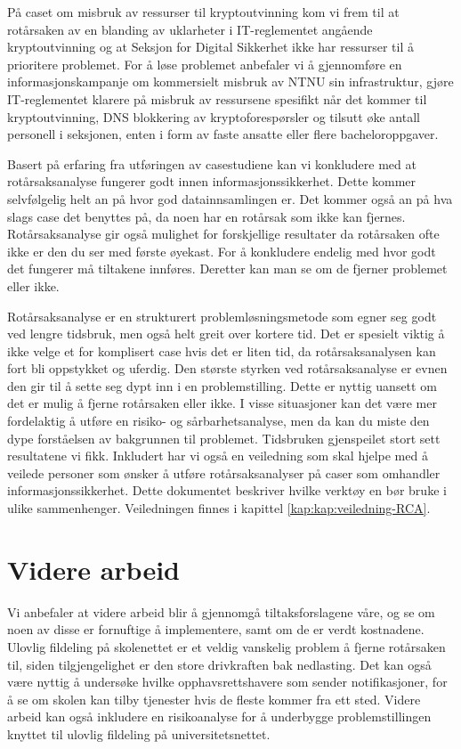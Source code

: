 \noindent På caset om misbruk av ressurser til kryptoutvinning kom vi frem til at rotårsaken av en blanding av uklarheter i IT-reglementet angående kryptoutvinning og at Seksjon for Digital Sikkerhet ikke har ressurser til å prioritere problemet. For å løse problemet anbefaler vi å gjennomføre en informasjonskampanje om kommersielt misbruk av NTNU sin infrastruktur, gjøre IT-reglementet klarere på misbruk av ressursene spesifikt når det kommer til kryptoutvinning, DNS blokkering av kryptoforespørsler og tilsutt øke antall personell i seksjonen, enten i form av faste ansatte eller flere bacheloroppgaver. 
\newline

\noindent Basert på erfaring fra utføringen av casestudiene kan vi konkludere med at rotårsaksanalyse fungerer godt innen informasjonssikkerhet. Dette kommer selvfølgelig helt an på hvor god datainnsamlingen er. Det kommer også an på hva slags case det benyttes på, da noen har en rotårsak som ikke kan fjernes. Rotårsaksanalyse gir også mulighet for forskjellige resultater da rotårsaken ofte ikke er den du ser med første øyekast. For å konkludere endelig med hvor godt det fungerer må tiltakene innføres. Deretter kan man se om de fjerner problemet eller ikke. 
\newline

\noindent Rotårsaksanalyse er en strukturert problemløsningsmetode som egner seg godt ved lengre tidsbruk, men også helt greit over kortere tid. Det er spesielt viktig å ikke velge et for komplisert case hvis det er liten tid, da rotårsaksanalysen kan fort bli oppstykket og uferdig. Den største styrken ved rotårsaksanalyse er evnen den gir til å sette seg dypt inn i en problemstilling. Dette er nyttig uansett om det er mulig å fjerne rotårsaken eller ikke. I visse situasjoner kan det være mer fordelaktig å utføre en risiko- og sårbarhetsanalyse, men da kan du miste den dype forståelsen av bakgrunnen til problemet. Tidsbruken gjenspeilet stort sett resultatene vi fikk. Inkludert har vi også en veiledning som skal hjelpe med å veilede personer som ønsker å utføre rotårsaksanalyser på caser som omhandler informasjonssikkerhet. Dette dokumentet beskriver hvilke verktøy en bør bruke i ulike sammenhenger. Veiledningen finnes i kapittel \ref{kap:kap:veiledning-RCA}. 

\section{Videre arbeid}
Vi anbefaler at videre arbeid blir å gjennomgå tiltaksforslagene våre, og se om noen av disse er fornuftige å implementere, samt om de er verdt kostnadene. Ulovlig fildeling på skolenettet er et veldig vanskelig problem å fjerne rotårsaken til, siden tilgjengelighet er den store drivkraften bak nedlasting. Det kan også være nyttig å undersøke hvilke opphavsrettshavere som sender notifikasjoner, for å se om skolen kan tilby tjenester hvis de fleste kommer fra ett sted. Videre arbeid kan også inkludere en risikoanalyse for å underbygge problemstillingen knyttet til ulovlig fildeling på universitetsnettet. 

